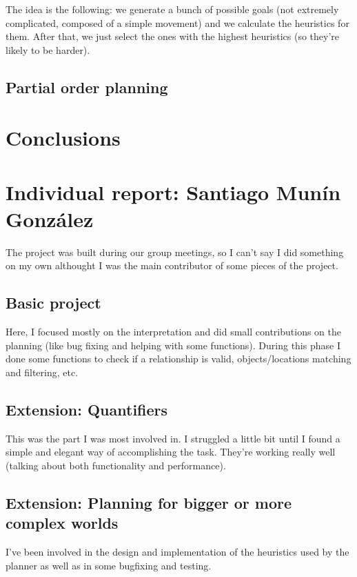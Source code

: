 \documentclass[11pt]{article}
\begin{document}
        The idea is the following: we generate a bunch of possible goals (not extremely complicated, composed 
        of a simple movement) and we calculate the heuristics for them. After that, we just select the ones with 
        the highest heuristics (so they're likely to be harder).
	\subsection{Partial order planning}

	\section{Conclusions}

\newpage
\appendix
\section{Individual report: Santiago Munín González}
The project was built during our group meetings, so I can't say I did something on my own althought I 
was the main contributor of some pieces of the project.

\subsection{Basic project}

Here, I focused mostly on the interpretation and did small contributions on the planning (like bug fixing and 
helping with some functions). During this phase I done some functions to check if a relationship is valid, 
objects/locations matching and filtering, etc.

\subsection{Extension: Quantifiers}

This was the part I was most involved in. I struggled a little 
bit until I found a simple and elegant way of accomplishing the task. They're working really well (talking about both functionality and performance).

\subsection{Extension: Planning for bigger or more complex worlds}

I've been involved in the design and implementation of the heuristics used by the planner as well as in some 
bugfixing and testing.
\end{document}
